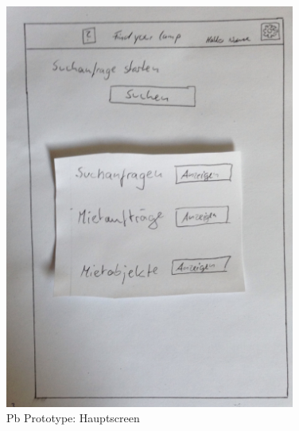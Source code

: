 \begin{figure}[H]
\centering
\includegraphics[angle=90, width=0.85\textwidth]{./images/paperbased/main.JPG}
\caption{Pb Prototype: Hauptscreen}
\label{pbprototype7}
\end{figure}

